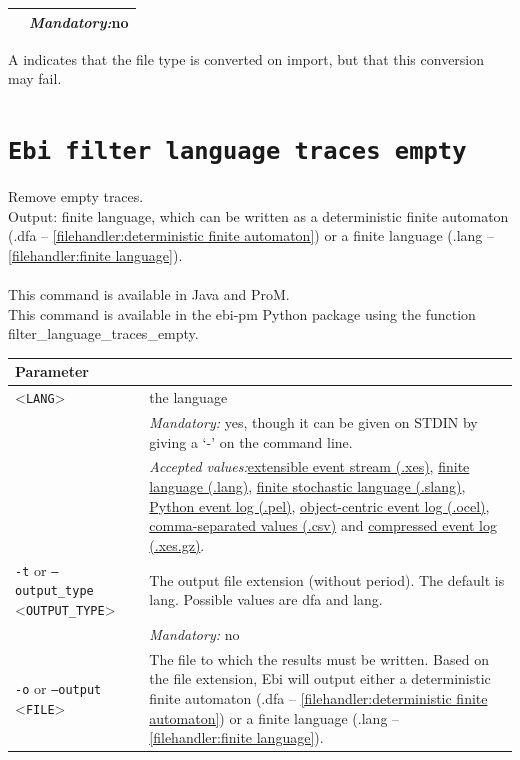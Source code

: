 {\begin{tabularx}{\linewidth}{lX}
&\textit{Mandatory:}\quad no\\
\bottomrule
\end{tabularx}
A \textdagger{} indicates that the file type is converted on import, but that this conversion may fail.
\clearpage\section{\texttt{Ebi filter language traces empty}}
\label{command:Ebi filter language traces empty}
Remove empty traces.\\
\noindent Output: finite language, which can be written as a deterministic finite automaton (.dfa -- \cref{filehandler:deterministic finite automaton}) or a finite language (.lang -- \cref{filehandler:finite language}).\\
\\This command is available in Java and ProM.
\\This command is available in the ebi-pm Python package using the function filter\_language\_traces\_empty.
\begin{tabularx}{\linewidth}{lX}
\toprule
Parameter \\\midrule
<\texttt{LANG}>&the language\\
&\textit{Mandatory:} \quad yes, though it can be given on STDIN by giving a `-' on the command line.\\
&\textit{Accepted values:}\quad \hyperref[filehandler:extensible event stream]{extensible event stream (.xes)}, \hyperref[filehandler:finite language]{finite language (.lang)}, \hyperref[filehandler:finite stochastic language]{finite stochastic language (.slang)}, \hyperref[filehandler:Python event log]{Python event log (.pel)}, \hyperref[filehandler:object-centric event log]{object-centric event log (.ocel)}, \hyperref[filehandler:comma-separated values]{comma-separated values (.csv)} and \hyperref[filehandler:compressed event log]{compressed event log (.xes.gz)}.\\
\texttt{-t} or \texttt{--output\_type} <\texttt{OUTPUT\_TYPE}> &
The output file extension (without period). The default is lang. Possible values are dfa and lang.\\
&\textit{Mandatory:} \quad no\\
\texttt{-o} or \texttt{--output} <\texttt{FILE}> &
The file to which the results must be written. Based on the file extension, Ebi will output either a deterministic finite automaton (.dfa -- \cref{filehandler:deterministic finite automaton}) or a finite language (.lang -- \cref{filehandler:finite language}).

\end{tabularx}}
